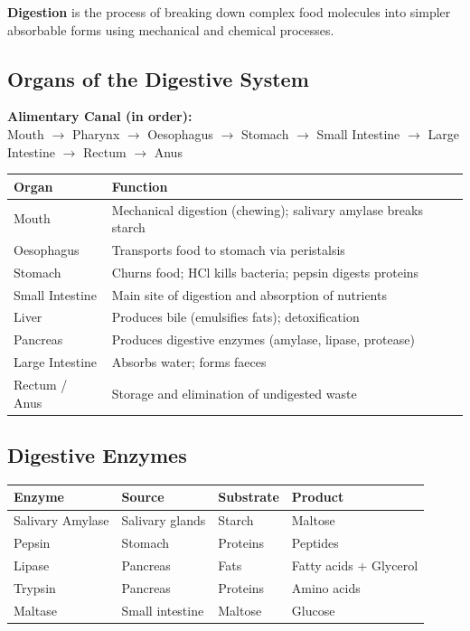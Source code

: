 \documentclass[12pt]{article}
\newcommand{\hcell}[1]{\textbf{\color{white}#1}}
\begin{document}
\begin{defbox}[Digestion]
\textbf{Digestion} is the process of breaking down complex food molecules into simpler absorbable forms using mechanical and chemical processes.
\end{defbox}

\subsection{Organs of the Digestive System}

\begin{keybox}
\textbf{Alimentary Canal (in order):}\\
Mouth $\to$ Pharynx $\to$ Oesophagus $\to$ Stomach $\to$ Small Intestine $\to$ Large Intestine $\to$ Rectum $\to$ Anus
\end{keybox}

\begin{center}
\renewcommand{\arraystretch}{1.4}
\begin{tabular}{|C{4cm}|C{8.5cm}|}
\hline
{}\hcell{Organ} & \hcell{Function} \\
\hline
Mouth & Mechanical digestion (chewing); salivary amylase breaks starch \\
 Oesophagus & Transports food to stomach via peristalsis \\
Stomach & Churns food; HCl kills bacteria; pepsin digests proteins \\
 Small Intestine & Main site of digestion and absorption of nutrients \\
Liver & Produces bile (emulsifies fats); detoxification \\
 Pancreas & Produces digestive enzymes (amylase, lipase, protease) \\
Large Intestine & Absorbs water; forms faeces \\
 Rectum / Anus & Storage and elimination of undigested waste \\
\hline
\end{tabular}
\end{center}

\subsection{Digestive Enzymes}
\begin{center}
\renewcommand{\arraystretch}{1.4}
\begin{tabular}{|C{3.5cm}|C{3cm}|C{3cm}|C{3cm}|}
\hline
{}\hcell{Enzyme} & \hcell{Source} & \hcell{Substrate} & \hcell{Product} \\
\hline
Salivary Amylase & Salivary glands & Starch & Maltose \\
 Pepsin & Stomach & Proteins & Peptides \\
Lipase & Pancreas & Fats & Fatty acids + Glycerol \\
 Trypsin & Pancreas & Proteins & Amino acids \\
Maltase & Small intestine & Maltose & Glucose \\
\hline
\end{tabular}
\end{center}
\end{document}
